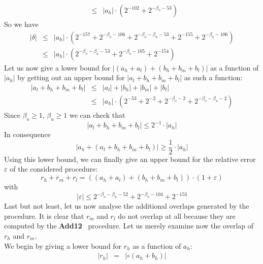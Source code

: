 \documentclass[a4paper,10pt,twoside]{article}
\newenvironment{proof}[1][Proof]{\begin{trivlist}
\item[\hskip \labelsep {\bfseries #1}]}{\end{trivlist}}
\newcommand{\hi}{\ensuremath{\mathit{h}}}
\newcommand{\mi}{\ensuremath{\mathit{m}}}
\newcommand{\lo}{\ensuremath{\mathit{l}}}
\newcommand{\Add}{{\bf Add12}}
\renewcommand{\epsilon}{\varepsilon}
\begin{document}
\begin{proof}
\begin{eqnarray*}
& \leq & \left \vert a_\hi \right \vert \cdot \left( 2^{-102} + 2^{-\beta_o -53} \right)
\end{eqnarray*}
So we have
\begin{eqnarray*}
\left \vert \delta \right \vert & \leq & \left \vert a_\hi \right \vert \cdot 
\left( 2^{-157} + 2^{-\beta_o-106} + 2^{-\beta_o-\beta_u-53} + 2^{-155} + 2^{-\beta_o-106} \right) \\
& \leq & \left \vert a_\hi \right \vert \cdot 
\left( 2^{-\beta_o-\beta_u-53} + 2^{-\beta_o-105} + 2^{-154} \right)
\end{eqnarray*}
Let us now give a lower bound for 
$\left \vert \left( a_\hi + a_\lo \right) + \left( b_\hi + b_\mi + b_\lo \right) \right \vert$ as a function of
$\left \vert a_\hi \right \vert$ by getting out an upper bound for 
$\left \vert a_\lo + b_\hi + b_\mi + b_\lo \right \vert$ as such a function:
\begin{eqnarray*}
\left \vert a_\lo + b_\hi + b_\mi + b_\lo \right \vert & \leq & 
\left \vert a_\lo \right \vert + \left \vert b_\hi \right \vert + \left \vert b_\mi \right \vert + \left \vert b_\lo \right \vert \\
& \leq & \left \vert a_\hi \right \vert \cdot \left( 2^{-53} + 2^{-2} + 2^{-\beta_o-2} + 2^{-\beta_o-\beta_u-2} \right)
\end{eqnarray*}
Since $\beta_o \geq 1$, $\beta_u \geq 1$ we can check that 
$$\left \vert a_\lo + b_\hi + b_\mi + b_\lo \right \vert \leq 2^{-1} \cdot \left \vert a_\hi \right \vert$$
In consequence
$$\left \vert a_\hi + \left( a_\lo + b_\hi + b_\mi + b_\lo \right) \right \vert \geq \frac{1}{2} \cdot \left \vert a_\hi \right \vert$$
Using this lower bound, we can finally give an upper bound for the relative error $\epsilon$ of the considered procedure:
$$r_\hi + r_\mi + r_\lo = \left( \left( a_\hi + a_\lo \right) + \left( b_\hi + b_\mi + b_\lo \right) \right) \cdot \left( 1 + \epsilon \right)$$
with
$$\left \vert \epsilon \right \vert \leq 2^{-\beta_o-\beta_u-52} + 2^{-\beta_o-104} + 2^{-153}$$
Last but not least, let us now analyse the additional overlaps generated by the procedure. It is clear that 
$r_\mi$ and $r_\lo$ do not overlap at all because they are computed by the \Add~ procedure. 
Let us merely examine now the overlap of $r_\hi$ and $r_\mi$. \\
We begin by giving a lower bound for $r_\hi$ as a function of $a_\hi$:
\begin{eqnarray*}
\left \vert r_\hi \right \vert & = & \left \vert \circ \left( a_\hi + b_\hi \right) \right \vert \\

\end{eqnarray*}
\end{proof}
\end{document}
